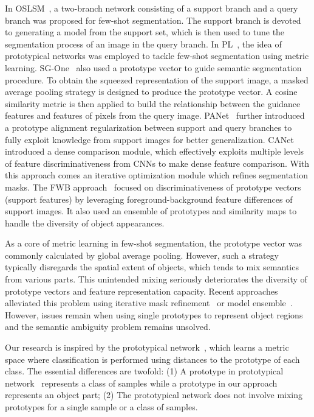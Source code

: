 \documentclass[runningheads]{llncs}
\begin{document}
In OSLSM~\cite{OSLSM}, a two-branch network consisting of a support branch and a query branch was proposed for few-shot segmentation. The support branch is devoted to generating a model from the support set, which is then used to tune the segmentation process of an image in the query branch.
In PL~\cite{BMVC18Prototype}, the idea of prototypical networks was employed to tackle few-shot segmentation using metric learning.
SG-One~\cite{SG-One} also used a prototype vector to guide semantic segmentation procedure. To obtain the squeezed representation of the support image, a masked average pooling strategy is designed to produce the prototype vector. A cosine similarity metric is then applied to build the relationship between the guidance features and features of pixels from the query image. 
PANet~\cite{PANet} further introduced a prototype alignment regularization between support and query branches to fully exploit knowledge from support images for better generalization.
CANet ~\cite{CaNet} introduced a dense comparison module, which effectively exploits multiple levels of feature discriminativeness from CNNs to make dense feature comparison. With this approach comes an iterative optimization module which reﬁnes segmentation masks.
The FWB approach~\cite{FWB-ICCV2019} focused on discriminativeness of prototype vectors (support features) by leveraging foreground-background feature differences of support images. It also used an ensemble of prototypes and similarity maps to handle the diversity of object appearances.

As a core of metric learning in few-shot segmentation, the prototype vector was commonly calculated by global average pooling. 
However, such a strategy typically disregards the spatial extent of objects, which tends to mix semantics from various parts. This unintended mixing seriously deteriorates the diversity of prototype vectors and feature representation capacity. 
Recent approaches alleviated this problem using iterative mask refinement~\cite{CaNet} or model ensemble~\cite{FWB-ICCV2019}. 
However, issues remain when using single prototypes to represent object regions and the semantic ambiguity problem remains unsolved. 

Our research is inspired by the prototypical network~\cite{PrototypicalNet17}, which learns a metric space where classification is performed using distances to the prototype of each class. The essential differences are twofold: (1) A prototype in prototypical network~\cite{PrototypicalNet17} represents a class of samples while a prototype in our approach represents an object part; (2) The prototypical network does not involve mixing prototypes for a single sample or a class of samples.
\end{document}
